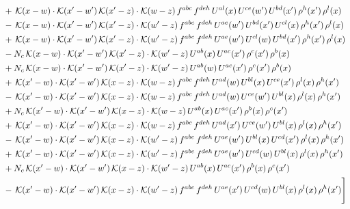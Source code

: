 \documentclass[9pt]{article}
\numberwithin{equation}{section}
\begin{document}
\begin{align}
& +\,\mathcal{K}(x-w)\cdot\mathcal{K}(x'-w')\,\mathcal{K}(x'-z)\cdot\mathcal{K}(w-z)\,f^{abc}\,f^{deh}\,U^{al}(x)\,U^{ce}(w')\,U^{bd}(x')\,\rho^{h}(x')\,\rho^{l}(x)\notag\\
& -\,\mathcal{K}(x-w)\cdot\mathcal{K}(x'-w')\,\mathcal{K}(x'-z)\cdot\mathcal{K}(w'-z)\,f^{abc}\,f^{deh}\,U^{ae}(w')\,U^{bd}(x')\,U^{cl}(x)\,\rho^{h}(x')\,\rho^{l}(x)\notag\\
& +\,\mathcal{K}(x-w)\cdot\mathcal{K}(x'-w')\,\mathcal{K}(x'-z)\cdot\mathcal{K}(w'-z)\,f^{abc}\,f^{deh}\,U^{ae}(w')\,U^{cl}(w)\,U^{bd}(x')\,\rho^{h}(x')\,\rho^{l}(x)\notag\\
& -N_{c}\,\mathcal{K}(x-w)\cdot\mathcal{K}(x'-w')\,\mathcal{K}(x'-z)\cdot\mathcal{K}(w'-z)\,U^{ab}(x)\,U^{ac}(x')\,\rho^{c}(x')\,\rho^{b}(x)\notag\\
& +N_{c}\,\mathcal{K}(x-w)\cdot\mathcal{K}(x'-w')\,\mathcal{K}(x'-z)\cdot\mathcal{K}(w'-z)\,U^{ab}(w)\,U^{ac}(x')\,\rho^{c}(x')\,\rho^{b}(x)\notag\\
& +\,\mathcal{K}(x'-w)\cdot\mathcal{K}(x'-w')\,\mathcal{K}(x-z)\cdot\mathcal{K}(w-z)\,f^{abc}\,f^{deh}\,U^{ad}(w)\,U^{bl}(x)\,U^{ce}(x')\,\rho^{l}(x)\,\rho^{h}(x')\notag\\
& -\,\mathcal{K}(x'-w)\cdot\mathcal{K}(x'-w')\,\mathcal{K}(x-z)\cdot\mathcal{K}(w-z)\,f^{abc}\,f^{deh}\,U^{ad}(w)\,U^{ce}(w')\,U^{bl}(x)\,\rho^{l}(x)\,\rho^{h}(x')\notag\\
& +N_{c}\,\mathcal{K}(x'-w)\cdot\mathcal{K}(x'-w')\,\mathcal{K}(x-z)\cdot\mathcal{K}(w-z)\,U^{ab}(x)\,U^{ac}(x')\,\rho^{b}(x)\,\rho^{c}(x')\notag\\
& +\,\mathcal{K}(x'-w)\cdot\mathcal{K}(x'-w')\,\mathcal{K}(x-z)\cdot\mathcal{K}(w-z)\,f^{abc}\,f^{deh}\,U^{ad}(x')\,U^{ce}(w')\,U^{bl}(x)\,\rho^{l}(x)\,\rho^{h}(x')\notag\\
& -\,\mathcal{K}(x'-w)\cdot\mathcal{K}(x'-w')\,\mathcal{K}(x-z)\cdot\mathcal{K}(w'-z)\,f^{abc}\,f^{deh}\,U^{ae}(w')\,U^{bl}(x)\,U^{cd}(x')\,\rho^{l}(x)\,\rho^{h}(x')\notag\\
& +\,\mathcal{K}(x'-w)\cdot\mathcal{K}(x'-w')\,\mathcal{K}(x-z)\cdot\mathcal{K}(w'-z)\,f^{abc}\,f^{deh}\,U^{ae}(w')\,U^{cd}(w)\,U^{bl}(x)\,\rho^{l}(x)\,\rho^{h}(x')\notag\\
& +N_{c}\,\mathcal{K}(x'-w)\cdot\mathcal{K}(x'-w')\,\mathcal{K}(x-z)\cdot\mathcal{K}(w'-z)\,U^{ab}(x)\,U^{ac}(x')\,\rho^{b}(x)\,\rho^{c}(x')\notag\\
& -\,\mathcal{K}(x'-w)\cdot\mathcal{K}(x'-w')\,\mathcal{K}(x-z)\cdot\mathcal{K}(w'-z)\,f^{abc}\,f^{deh}\,U^{ae}(x')\,U^{cd}(w)\,U^{bl}(x)\,\rho^{l}(x)\,\rho^{h}(x')\Bigg]
\end{align}
\end{document}
